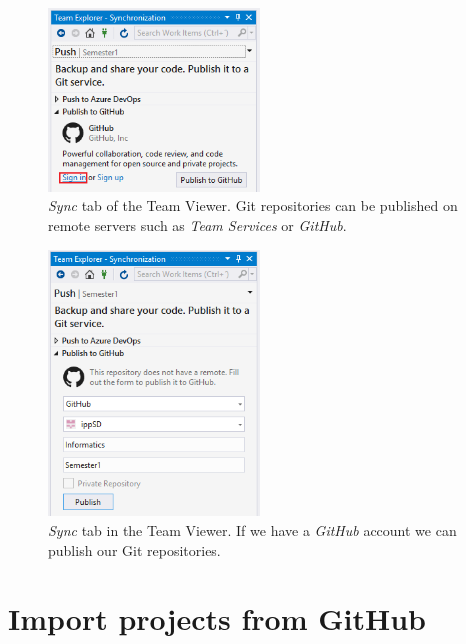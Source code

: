 \begin{figure}[h]
	\centering
	\includegraphics[width=0.5\textwidth]{Figures/GH0V3.png}
	\caption{\textit{Sync} tab of the Team Viewer. Git repositories can be published on remote servers such as \textit{Team Services} or \textit{GitHub}.}
	\label{fig:GitHub0}
\end{figure}


\begin{figure}[h]
	\centering
	\includegraphics[width=0.5\textwidth]{Figures/GH2V3.png}
	\caption{\textit{Sync} tab in the Team Viewer. If we have a \textit{GitHub} account we can publish our Git repositories.}
	\label{fig:GitHub2}
\end{figure}

    \section{Import projects from GitHub}

